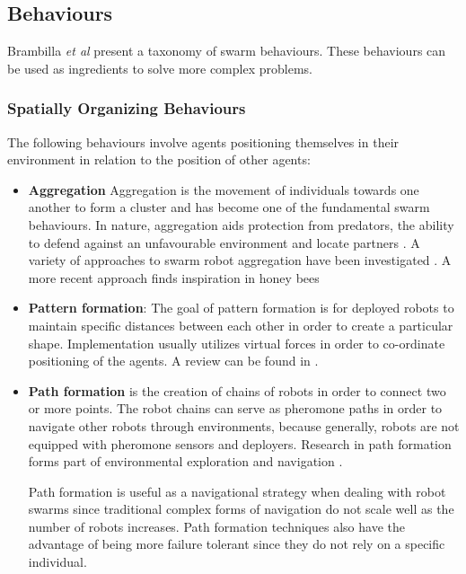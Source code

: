\subsection{Behaviours}
\label{swarmrobotapplications}

Brambilla \textit{et al} \cite{brambilla2013swarm} present a taxonomy of swarm behaviours. These behaviours can be used as ingredients to solve more complex problems.

\subsubsection{Spatially Organizing Behaviours}
The following behaviours involve agents positioning themselves in their environment in relation to the position of other agents:

\begin{itemize}
	\item \textbf{Aggregation} Aggregation is the movement of individuals towards one another to form a cluster and has become one of the fundamental swarm behaviours. In nature, aggregation aids protection from predators, the ability to defend against an unfavourable environment and locate partners \cite{bonabeau2001self}. A variety of approaches to swarm robot aggregation have been investigated \cite{yan2011algorithm, soysal2007aggregation, trianni2003evolving}. A more recent approach finds inspiration in honey bees \cite{schmickl2011beeclust, schmickl2009two}
	
	\item \textbf{Pattern formation}:
	The goal of pattern formation is for deployed robots to maintain specific distances between each other in order to create a particular shape. Implementation usually utilizes virtual forces in order to co-ordinate positioning of the agents. A review can be found in \cite{bahceci2003review, hettiarachchi2009review}.
	
	\item \textbf{Path formation} is the creation of chains of robots in order to connect two or more points. The robot chains can serve as pheromone paths in order to navigate other robots through environments, because generally, robots are not equipped with pheromone sensors and deployers. Research in path formation forms part of environmental exploration and navigation \cite{nouyan2006chain}. 
	
	Path formation is useful as a navigational strategy when dealing with robot swarms since traditional complex forms of navigation do not scale well as the number of robots increases. Path formation techniques also have the advantage of being more failure tolerant since they do not rely on a specific individual.
	

\end{itemize}
